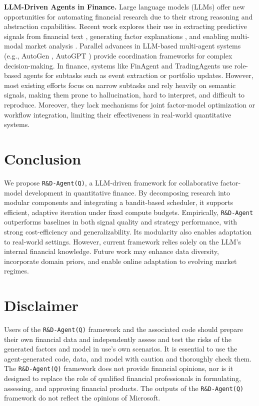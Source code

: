 \documentclass{article}
\newcommand{\name}{\texttt{R\&D-Agent(Q)}}
\begin{document}
\textbf{LLM-Driven Agents in Finance.}
Large language models (LLMs) offer new opportunities for automating financial research due to their strong reasoning and abstraction capabilities.
Recent work explores their use in extracting predictive signals from financial text \cite{liu2021finbert, lopezlira2023}, generating factor explanations \cite{wang2024llmfactor}, and enabling multi-modal market analysis \cite{zhang2024multimodal}.
Parallel advances in LLM-based multi-agent systems (e.g., AutoGen \cite{wu2024autogen}, AutoGPT \cite{yang2023auto}) provide coordination frameworks for complex decision-making. In finance, systems like FinAgent \cite{zhang2024multimodal} and TradingAgents\cite{xiao2024tradingagents} use role-based agents for subtasks such as event extraction or portfolio updates. However, most existing efforts focus on narrow subtasks and rely heavily on semantic signals, making them prone to hallucination, hard to interpret, and difficult to reproduce. Moreover, they lack mechanisms for joint factor-model optimization or workflow integration, limiting their effectiveness in real-world quantitative systems.

\section{Conclusion} \label{Conclusion}
We propose \texttt{\name}, a LLM-driven framework for collaborative factor-model development in quantitative finance. By decomposing research into modular components and integrating a bandit-based scheduler, it supports efficient, adaptive iteration under fixed compute budgets.
Empirically, \texttt{R\&D-Agent} outperforms baselines in both signal quality and strategy performance, with strong cost-efficiency and generalizability. Its modularity also enables adaptation to real-world settings. However, current framework relies solely on the LLM’s internal financial knowledge. Future work may enhance data diversity, incorporate domain priors, and enable online adaptation to evolving market regimes.

\section{Disclaimer}
Users of the \texttt{\name} framework and the associated code should prepare their own financial data and independently assess and test the risks of the generated factors and model in use's own scenarios. It is essential to use the agent-generated code, data, and model with caution and thoroughly check them. The \texttt{\name} framework does not provide financial opinions, nor is it designed to replace the role of qualified financial professionals in formulating, assessing, and approving financial products. The outputs of the \texttt{\name} framework do not reflect the opinions of Microsoft.
\end{document}
